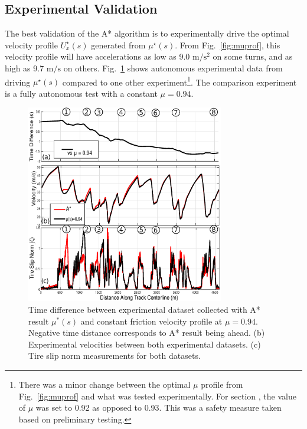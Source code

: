 \documentclass[9pt,shortpaper,twoside,web]{ieeecolor}
\newcommand*\circled[1]{\tikz[baseline=(char.base)]{
            \node[shape=circle,draw,inner sep=2pt] (char) {#1};}}
\begin{document}

\subsection{Experimental Validation}
The best validation of the A* algorithm is to experimentally drive the optimal velocity profile $U^\star_x(s)$ generated from $\mu^\star(s)$. From Fig.~\ref{fig:muprof}, this velocity profile will have accelerations as low as 9.0 $\mathrm{m/s^2}$ on some turns, and as high as 9.7 $\mathrm{m/s}$ on others. Fig.~\ref{fig:muexpres} shows autonomous experimental data from 
driving $\mu^\star(s)$ compared to one other experiment\footnote{There was a minor change between the optimal $\mu$ profile from Fig.~\ref{fig:muprof} and what was tested experimentally. For section \circled{2}, the value of $\mu$ was set to 0.92 as opposed to 0.93. This was a safety measure taken based on preliminary testing.}. The comparison experiment is a fully autonomous test with a constant $\mu = 0.94$.

\begin{figure}[tb]
\centering
\includegraphics[width=3.4in]{figures/expAstarResults.eps}
\caption{Time difference between experimental dataset collected with A* result $\mu^*(s)$ and constant friction velocity profile at $\mu = 0.94$. Negative time distance corresponds to A* result being ahead. (b) Experimental velocities between both experimental datasets.
(c) Tire slip norm measurements for both datasets.}
\label{fig:muexpres}
\end{figure}  
\end{document}
